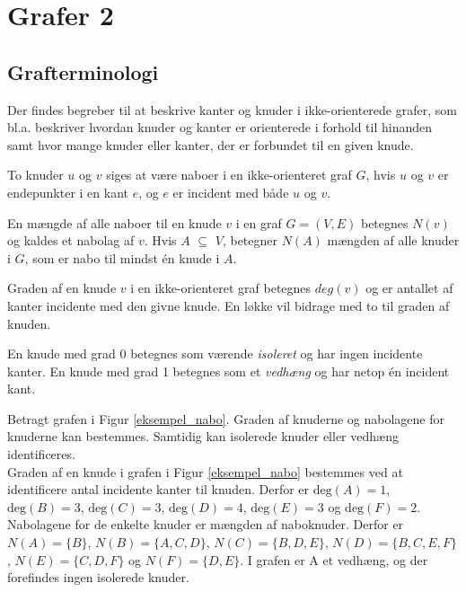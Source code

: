 \usetikzlibrary{arrows, positioning}
\section{Grafer 2}
\subsection{Grafterminologi}

Der findes begreber til at beskrive kanter og knuder i ikke-orienterede grafer, som bl.a. beskriver hvordan knuder og kanter er orienterede i forhold til hinanden samt hvor mange knuder eller kanter, der er forbundet til en given knude.

\begin{defn}
To knuder $u$ og $v$ siges at være naboer i en ikke-orienteret graf $G$, hvis $u$ og $v$ er endepunkter i en kant $e$, og $e$ er incident med både $u$ og $v$.
\end{defn}

\begin{defn}
En mængde af alle naboer til en knude $v$ i en graf $G=(V,E)$ betegnes $N(v)$ og kaldes et nabolag af $v$. Hvis $A$ $\subseteq$ $V$, betegner $N(A)$ mængden af alle knuder i $G$, som er nabo til mindst én knude i $A$.
\end{defn}

\begin{defn}
Graden af en knude $v$ i en ikke-orienteret graf betegnes $deg(v)$ og er antallet af kanter incidente med den givne knude.  En løkke vil bidrage med to til graden af knuden. 
\end{defn}

\noindent En knude med grad 0 betegnes som værende \textit{isoleret} og har ingen incidente kanter. En knude med grad 1 betegnes som et \textit{vedhæng} og har netop én incident kant.

\begin{exmp}
Betragt grafen i Figur \ref{eksempel_nabo}. Graden af knuderne og nabolagene for knuderne kan bestemmes. Samtidig kan isolerede knuder eller vedhæng identificeres.\\
Graden af en knude i grafen i Figur \ref{eksempel_nabo} bestemmes ved at identificere antal incidente kanter til knuden. Derfor er $\textrm{deg}(A)=1$, $\textrm{deg}(B)=3$, $\textrm{deg}(C)=3$, $\textrm{deg}(D)=4$, $\textrm{deg}(E)=3$ og $\textrm{deg}(F)=2$. 
Nabolagene for de enkelte knuder er mængden af naboknuder. 
Derfor er $N(A)=\lbrace B \rbrace$, $N(B)=\lbrace A, C, D \rbrace$, $N(C)=\lbrace B, D, E \rbrace$, $N(D)=\lbrace B, C, E, F \rbrace$, $N(E)=\lbrace C, D, F \rbrace$ og $N(F)=\lbrace D, E \rbrace$. 
I grafen er A et vedhæng, og der forefindes ingen isolerede knuder.
\end{exmp}

